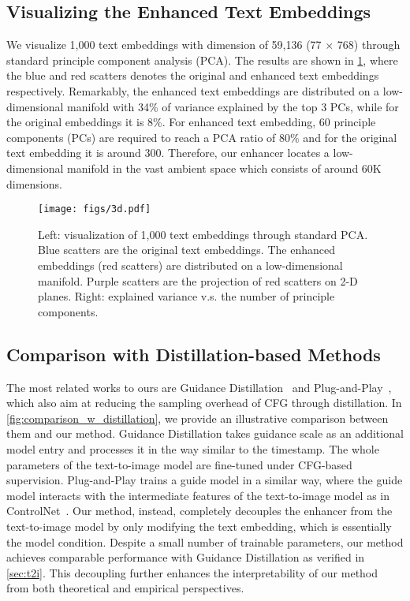  
\subsection{Visualizing the Enhanced Text Embeddings}
\label{sec:app_visulization}

We visualize 1,000 text embeddings with dimension of 59,136 (77 $\times$ 768) through standard principle component analysis (PCA). The results are shown in \cref{fig:3d}, where the blue and red scatters denotes the original and enhanced text embeddings respectively. Remarkably, the enhanced text embeddings are distributed on a low-dimensional manifold with 34\% of variance explained by the top 3 PCs, while for the original embeddings it is 8\%. For enhanced text embedding, 60 principle components (PCs) are required to reach a PCA ratio of 80\% and for the original text embedding it is around 300. Therefore, our enhancer locates a low-dimensional manifold in the vast ambient space which consists of around 60K dimensions.

\begin{figure}[t]
\begin{center}
    \texttt{[image: figs/3d.pdf]}
    \captionsetup{skip=2pt}
    \caption{Left: visualization of 1,000 text embeddings through standard PCA. Blue scatters are the original text embeddings. The enhanced embeddings (red scatters) are distributed on a low-dimensional manifold.
    Purple scatters are the projection of red scatters on 2-D planes. 
    Right: explained variance v.s. the number of principle components. 
    }
    \label{fig:3d}
\end{center}
\vskip -0.1in
\end{figure}


\subsection{Comparison with Distillation-based Methods}
\label{sec:comparison_w_distillation}
The most related works to ours are Guidance Distillation~\cite{meng2023distillation} and Plug-and-Play~\cite{hsiao2024plug}, which also aim at reducing the sampling overhead of CFG through distillation. In \cref{fig:comparison_w_distillation}, we provide an illustrative comparison between them and our method. 
Guidance Distillation takes guidance scale as an additional model entry and processes it in the way similar to the timestamp. The whole parameters of the text-to-image model are fine-tuned under CFG-based supervision. Plug-and-Play trains a guide model in a similar way, where the guide model interacts with the intermediate features of the text-to-image model as in ControlNet~\cite{zhang2023adding}. Our method, instead, completely decouples the enhancer from the text-to-image model by only modifying the text embedding, which is essentially the model condition. Despite a small number of trainable parameters, our method achieves comparable performance with Guidance Distillation as verified in \cref{sec:t2i}. This decoupling further enhances the interpretability of our method from both theoretical and empirical perspectives.

